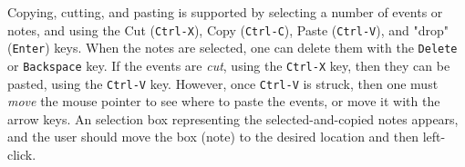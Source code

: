 %


   Copying, cutting, and pasting is supported by selecting a number of events
   or notes, and using the
    Cut (\texttt{Ctrl-X}), 
    Copy (\texttt{Ctrl-C}),
    Paste (\texttt{Ctrl-V}), and
   "drop" (\texttt{Enter})
   keys.
   When the notes are selected,
   one can delete them with the \texttt{Delete} or \texttt{Backspace} key.
   If the events are \textsl{cut}, using the \texttt{Ctrl-X} key, then
   they can be pasted, using the \texttt{Ctrl-V} key.  However,
   once \texttt{Ctrl-V} is struck, then one must \textsl{move} the mouse
   pointer to see where to paste the events, or move it with the arrow keys.
   An selection box representing the
   selected-and-copied notes appears, and the user should move the box (note)
   to the desired location and then left-click.

